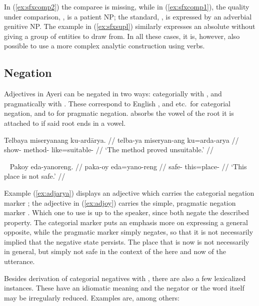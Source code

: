 In (\ref{ex:sfxcomp2}) the comparee is missing, while in (\ref{ex:sfxcomp1}),
the quality under comparison, , is a patient NP; the standard, , is expressed
by an adverbial genitive NP. The example in (\ref{ex:sfxsupl}) similarly
expresses an absolute without giving a group of entities to draw from. In all
these cases, it is, however, also possible to use a more complex analytic
construction using verbs.


\subsection{Negation}
\label{subsec:adjneg}

Adjectives in Ayeri can be negated in two ways: categorially with 
, and pragmatically with . These correspond to
English , and  etc.\ for categorial negation, and to
 for pragmatic negation.  absorbs the vowel of the root 
it is attached to if said root ends in a vowel.

\ex\label{ex:adjarya}\begingl
	\gla Telbaya miseryanang ku-ardārya. //
	\glb telba-ya miseryan-ang ku=arda-arya //
	\glc show-\TsgM{} method-\Aarg{} like=suitable-\Neg{} //
	\glft `The method proved unsuitable.' //
\endgl\xe

\ex~\label{ex:adjoy}\begingl
	\gla Pakoy eda-yanoreng. //
	\glb paka-oy eda=yano-reng //
	\glc safe-\Neg{} this=place-\AargI{} //
	\glft `This place is not safe.' //
\endgl\xe

Example (\ref{ex:adjarya}) displays an adjective which carries the categorial
negation marker ; the adjective in (\ref{ex:adjoy}) carries
the simple, pragmatic negation marker . Which one to use is up
to the speaker, since both negate the described property. The categorial marker
puts an emphasis more on expressing a general opposite, while the pragmatic
marker simply negates, so that it is not necessarily implied that the negative
state persists. The place that is  now is not
necessarily  in general, but simply not safe in
the context of the here and now of the utterance.

Besides  derivation of categorial negatives with ,
there are also a few lexicalized instances. These have an idiomatic meaning and
the negator or the word itself may be irregularly reduced. Examples are, among
others:

